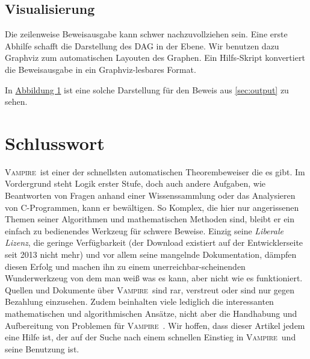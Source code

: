\documentclass{article}
\newcommand{\vampire}{\textsc{Vampire}~}
\begin{document}
\subsection{Visualisierung}
\label{subsec:outputvis}

Die zeilenweise Beweisausgabe kann schwer nachzuvollziehen sein. Eine erste Abhilfe schafft
die Darstellung des DAG in der Ebene. Wir benutzen dazu Graphviz zum automatischen Layouten
des Graphen. Ein Hilfs-Skript konvertiert die Beweisausgabe in ein Graphviz-lesbares Format.

In \hyperref[fig:pytripleproof]{Abbildung 1} ist eine solche Darstellung für den Beweis aus \ref{sec:output} 
zu sehen.




\section{Schlusswort}
\label{sec:conclusion}
\vampire ist einer der schnellsten automatischen Theorembeweiser die es gibt. Im Vordergrund steht Logik erster Stufe, doch auch andere Aufgaben, wie Beantworten von Fragen anhand einer Wissenssammlung oder das Analysieren von C-Programmen, kann er bewältigen. So Komplex, die hier nur angerissenen Themen seiner Algorithmen und mathematischen Methoden sind, bleibt er ein einfach zu bedienendes Werkzeug für schwere Beweise. Einzig seine \textit{Liberale Lizenz}, die geringe Verfügbarkeit (der Download existiert auf der Entwicklerseite seit 2013 nicht mehr) und vor allem seine mangelnde Dokumentation, dämpfen diesen Erfolg und machen ihn zu einem unerreichbar-scheinenden Wunderwerkzeug von dem man weiß was es kann, aber nicht wie es funktioniert. Quellen und Dokumente über \vampire sind rar, verstreut oder sind nur gegen Bezahlung einzusehen. Zudem beinhalten viele lediglich die interessanten mathematischen und algorithmischen Ansätze, nicht aber die Handhabung und Aufbereitung von Problemen für \vampire. Wir hoffen, dass dieser Artikel jedem eine Hilfe ist, der auf der Suche nach einem schnellen Einstieg in \vampire und seine Benutzung ist.






\end{document}
